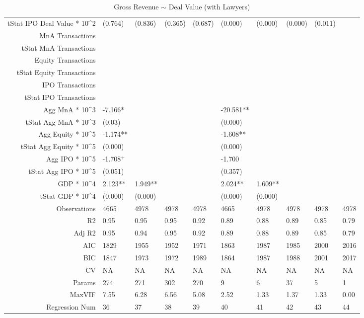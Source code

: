 \begin{table}[ht]
\begin{tabular}{rlllllllll}
  tStat IPO Deal Value * 10^2 & (0.764) & (0.836) & (0.365) & (0.687) & (0.000) & (0.000) & (0.000) & (0.011) &  \\ 
  MnA Transactions &  &  &  &  &  &  &  &  &  \\ 
  tStat MnA Transactions &  &  &  &  &  &  &  &  &  \\ 
  Equity Transactions &  &  &  &  &  &  &  &  &  \\ 
  tStat Equity Transactions &  &  &  &  &  &  &  &  &  \\ 
  IPO Transactions &  &  &  &  &  &  &  &  &  \\ 
  tStat IPO Transactions &  &  &  &  &  &  &  &  &  \\ 
  Agg MnA * 10^3 & -7.166* &  &  &  & -20.581** &  &  &  &  \\ 
  tStat Agg MnA * 10^3 & (0.03) &  &  &  & (0.000) &  &  &  &  \\ 
  Agg Equity * 10^5 & -1.174** &  &  &  & -1.608** &  &  &  &  \\ 
  tStat Agg Equity * 10^5 & (0.000) &  &  &  & (0.000) &  &  &  &  \\ 
  Agg IPO * 10^5 & -1.708$^{+}$ &  &  &  & -1.700 &  &  &  &  \\ 
  tStat Agg IPO * 10^5 & (0.051) &  &  &  & (0.357) &  &  &  &  \\ 
  GDP * 10^4 & 2.123** & 1.949** &  &  & 2.024** & 1.609** &  &  &  \\ 
  tStat GDP * 10^4 & (0.000) & (0.000) &  &  & (0.000) & (0.000) &  &  &  \\ 
  Observations & 4665 & 4978 & 4978 & 4978 & 4665 & 4978 & 4978 & 4978 & 4978 \\ 
  R2 & 0.95 & 0.95 & 0.95 & 0.92 & 0.89 & 0.88 & 0.89 & 0.85 & 0.79 \\ 
  Adj R2 & 0.95 & 0.94 & 0.95 & 0.92 & 0.89 & 0.88 & 0.89 & 0.85 & 0.79 \\ 
  AIC & 1829 & 1955 & 1952 & 1971 & 1863 & 1987 & 1985 & 2000 & 2016 \\ 
  BIC & 1847 & 1973 & 1972 & 1989 & 1864 & 1987 & 1988 & 2001 & 2017 \\ 
  CV & NA & NA & NA & NA & NA & NA & NA & NA & NA \\ 
  Params & 274 & 271 & 302 & 270 & 9 & 6 & 37 & 5 & 1 \\ 
  MaxVIF & 7.55 & 6.28 & 6.56 & 5.08 & 2.52 & 1.33 & 1.37 & 1.33 & 0.00 \\ 
  Regression Num & 36 & 37 & 38 & 39 & 40 & 41 & 42 & 43 & 44 \\ 
   \hline
\end{tabular}
\caption{Gross Revenue $\sim$ Deal Value (with Lawyers)} 
\end{table}

